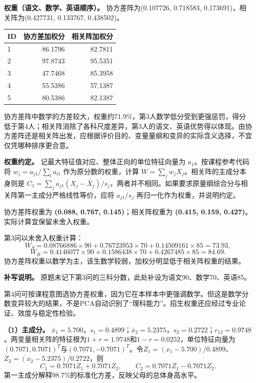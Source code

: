 \textbf{权重（语文、数学、英语顺序）。} 协方差阵为(0.107726, 0.718583, 0.173691)，相关阵为(0.427731, 0.133767, 0.438502)。

\begin{center}\small\setlength{\tabcolsep}{4pt}\renewcommand{\arraystretch}{1.18}\begin{tabular}{@{}lrr@{}}
\toprule
ID & 协方差加权分 & 相关阵加权分 \\
\midrule

1 & 86.1796 & 82.7811 \\
2 & 97.8743 & 95.5351 \\
3 & 47.7468 & 85.3958 \\
4 & 55.5386 & 57.1387 \\
5 & 80.5386 & 82.1387 \\
\bottomrule\end{tabular}\end{center}

协方差阵中数学的方差较大，权重约71.9\%，第3人数学低分受到更强惩罚，得分低于第4人；相关阵消除了各科尺度差异，第3人的语文、英语优势得以体现。由协方差阵还是相关阵出发，应根据评价目的、变量量纲和变异的实际含义选择，不宜仅凭哪种排序更合意。



\textbf{权重约定。} 记最大特征值对应、整体正向的单位特征向量为 \(a_1\)。按课程参考代码将 \(w_j=a_{j1}/\sum_l a_{l1}\) 作为原分数的权重，计算 \(W=\sum_jw_jX_j\)。相关阵的主成分本身则是 \(C_1=\sum_ja_{j1}(X_j-\bar X_j)/s_j\)，两者并不相同。如果要求原量纲综合分与相关阵第一主成分严格线性等价，应将 \(a_{j1}/s_j\) 再归一化作为权重，并说明约定。

协方差阵权重为 \textbf{(0.088, 0.767, 0.145)}；相关阵权重为 \textbf{(0.415, 0.159, 0.427)}。实际计算宜保留未舍入权重。

第3问以未舍入权重计算：
\[W_S=0.08766886\times90+0.76723953\times70+0.14509161\times85=73.93,\]
\[W_R=0.4146077\times90+0.1586438\times70+0.4267485\times85=84.69.\]
协方差阵权重以数学为主，该生数学较弱，加权分明显低于相关阵权重的结果。

\textbf{补写说明。} 原题未记下第3问的三科分数，此处补设为语文90、数学70、英语85。

第4问可按课程意图选协方差权重，因为它在本样本中更强调数学。但这是数学分数变异较大的结果，不是PCA自动识别了``理科能力''。招生权重还应经过专业论证、效度与稳定性检验。



\textbf{（1）主成分。} \(\bar x_1=5.700\)，\(s_1=0.4899\)；\(\bar x_2=5.2375\)，\(s_2=0.2722\)；\(r_{12}=0.9748\)。两变量相关阵的特征根为\(1+r=1.9748\)和\(1-r=0.0252\)，单位特征向量为\((0.7071,0.7071)^T\)与\((0.7071,-0.7071)^T\)。令\(Z_1=(x_1-5.700)/0.4899\)、\(Z_2=(x_2-5.2375)/0.2722\)，则
\[C_1=0.7071Z_1+0.7071Z_2,\qquad C_2=0.7071Z_1-0.7071Z_2.\]
第一主成分解释98.7\%的标准化方差，反映父母的总体身高水平。

